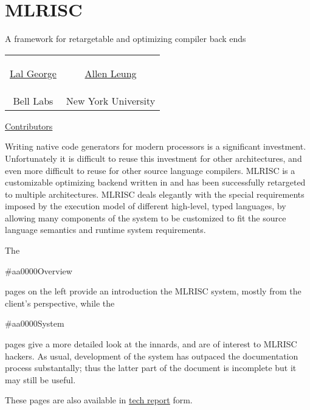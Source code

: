 \section{MLRISC}
  \begin{center} 
    \begin{Bold}
     A framework for retargetable and optimizing compiler back ends 
    \end{Bold}
  \end{center}
\begin{center}
  \begin{tabular}{cc} 
    \begin{address}
      \href{mailto:george@research.bell-labs.com}{Lal George} 
    \end{address} &
    \begin{address}
      \href{mailto:leunga@cs.nyu.edu}{ Allen Leung}
    \end{address} \\
       Bell Labs & New York University \\
  \end{tabular}   
\end{center}

\begin{center}

\begin{Italics}
   \href{contributors.html}{Contributors}
\end{Italics}
\end{center}

Writing native code generators for modern processors is a significant
investment.  Unfortunately it is difficult
to reuse this investment for other architectures, and even more
difficult to reuse for other source language compilers.   MLRISC is
a customizable optimizing backend written in
and has been successfully retargeted to multiple architectures.
MLRISC deals elegantly with the special requirements imposed by the
execution model of different high-level, typed languages, by allowing
many components of the system to be customized to fit the source language
semantics and runtime system requirements.

The \begin{color}{#aa0000}Overview\end{color} pages on the left provide 
an introduction the MLRISC system, mostly from the client's perspective,  
while the \begin{color}{#aa0000}System\end{color}
pages give a more detailed look at the 
innards, and are of interest to MLRISC hackers.   As usual, development of
the system has outpaced the documentation process substantally; thus
the latter part of the document is incomplete but it may still be useful. 

These pages are also available in 
\href{../latex/mlrisc.ps}{tech report} form.
